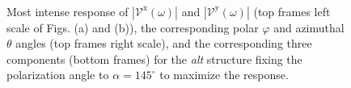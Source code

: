 \documentclass[prb,11pt,tightenlines,twocolumn,aps]{revtex4-1}
\begin{document}
\begin{figure}[tb]
    \centering
    \\

    \caption{Most intense response of
    $|\mathcal{V}^{\mathrm{x}}(\omega)|$ and
    $|\mathcal{V}^{\mathrm{y}}(\omega)|$ (top frames left scale of Figs. (a) and
    (b)), the corresponding polar $\varphi$ and azimuthal $\theta$ angles (top
    frames right scale), and the corresponding three components (bottom frames)
    for the \emph{alt} structure fixing the polarization angle to
    $\alpha=145^{\circ}$ to maximize the response.}
    \label{fig:alt-vab-comp-rtp}
\end{figure}
\end{document}
